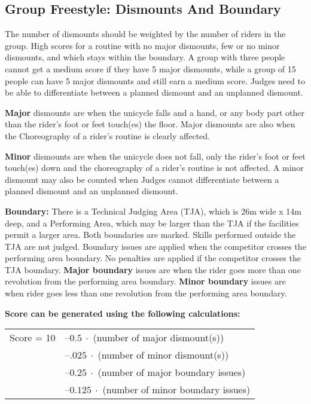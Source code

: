 \subsection{Group Freestyle: Dismounts And Boundary \label{subsec:freestyle_group-additional-judging-criteria_dismounts-boundary}}
The number of dismounts should be weighted by the number of riders in the group.
High scores for a routine with no major dismounts, few or no minor dismounts, and which stays within the boundary.
A group with three people cannot get a medium score if they have 5 major dismounts, while a group of 15 people can have 5 major dismounts and still earn a medium score.
Judges need to be able to differentiate between a planned dismount and an unplanned dismount.

\textbf{Major} dismounts are when the unicycle falls and a hand, or any body part other than the rider's foot or feet touch(es) the floor.
Major dismounts are also when the Choreography of a rider's routine is clearly affected.

\textbf{Minor} dismounts are when the unicycle does not fall, only the rider's foot or feet touch(es) down and the choreography of a rider's routine is not affected.
A minor dismount may also be counted when Judges cannot differentiate between a planned dismount and an unplanned dismount.

\textbf{Boundary:} There is a Technical Judging Area (TJA), which is 26m wide x 14m deep, and a Performing Area, which may be larger than the TJA if the facilities permit a larger area.
Both boundaries are marked.
Skills performed outside the TJA are not judged.
Boundary issues are applied when the competitor crosses the performing area boundary.
No penalties are applied if the competitor crosses the TJA boundary.
\textbf{Major boundary }issues are when the rider goes more than one revolution from the performing area boundary.
\textbf{Minor boundary} issues are when rider goes less than one revolution from the performing area boundary.

\textbf{Score can be generated using the following calculations:}  \\
\begin{tabular}{r l}
Score = 10 & $– 0.5\ \cdot$ (number of major dismount(s)) \\
 & $– .025\ \cdot$ (number of minor dismount(s)) \\
 & $– 0.25\ \cdot$ (number of major boundary issues) \\
& $– 0.125\ \cdot$ (number of minor boundary issues) \\
\end{tabular}

